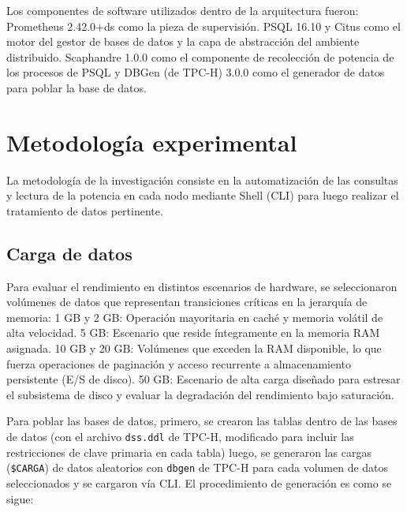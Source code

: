 \documentclass[12pt, letter paper]{report}
\begin{document}
      Los componentes de software utilizados dentro de la arquitectura fueron:
      Prometheus 2.42.0+ds como la pieza de supervisión. PSQL 16.10 y Citus como
      el motor del gestor de bases de datos y la capa de abstracción del
      ambiente distribuido. Scaphandre 1.0.0 como el componente de recolección
      de potencia de los procesos de PSQL y  DBGen (de TPC-H) 3.0.0 como el
      generador de datos para poblar la base de datos.

    \section{Metodología experimental} %
    \label{sec:metodología_experimental}
      La metodología de la investigación consiste en la automatización de las
      consultas y lectura de la potencia en cada nodo mediante Shell (CLI) para
      luego realizar el tratamiento de datos pertinente.

      \subsection{Carga de datos} %
      \label{sub:carga_de_datos}
        Para evaluar el rendimiento en distintos escenarios de hardware, se
        seleccionaron volúmenes de datos que representan transiciones críticas
        en la jerarquía de memoria: 1 GB y 2 GB: Operación mayoritaria en caché
        y memoria volátil de alta velocidad. 5 GB: Escenario que reside
        íntegramente en la memoria RAM asignada. 10 GB y 20 GB: Volúmenes que
        exceden la RAM disponible, lo que fuerza operaciones de paginación y
        acceso recurrente a almacenamiento persistente (E/S de disco). 50 GB:
        Escenario de alta carga diseñado para estresar el subsistema de disco y
        evaluar la degradación del rendimiento bajo saturación.

        Para poblar las bases de datos, primero, se crearon las tablas dentro de
        las bases de datos (con el archivo \texttt{dss.ddl} de TPC-H, modificado
        para incluir las restricciones de clave primaria en cada tabla) luego,
        se generaron las cargas (\texttt{\$CARGA}) de datos aleatorios con
        \texttt{dbgen} de TPC-H  para cada volumen de datos seleccionados y se
        cargaron vía CLI. El procedimiento de generación es como se sigue:
\end{document}
